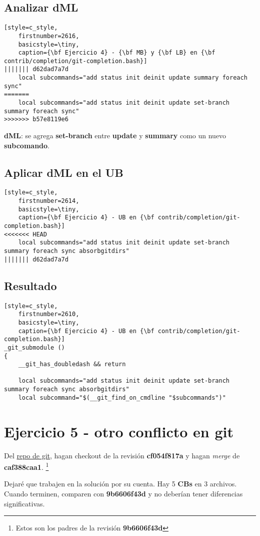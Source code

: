 \subsection*{Analizar {\bf dML}}
\begin{lstlisting}[style=c_style,
	firstnumber=2616,
	basicstyle=\tiny,
	caption={\bf Ejercicio 4} - {\bf MB} y {\bf LB} en {\bf contrib/completion/git-completion.bash}]
||||||| d62dad7a7d
	local subcommands="add status init deinit update summary foreach sync"
=======
	local subcommands="add status init deinit update set-branch summary foreach sync"
>>>>>>> b57e8119e6
\end{lstlisting}

{\bf dML}: se agrega {\bf set-branch} entre {\bf update} y {\bf summary} como un nuevo {\bf subcomando}.

\subsection*{Aplicar {\bf dML} en el {\bf UB}}
\begin{lstlisting}[style=c_style,
	firstnumber=2614,
	basicstyle=\tiny,
	caption={\bf Ejercicio 4} - UB en {\bf contrib/completion/git-completion.bash}]
<<<<<<< HEAD
	local subcommands="add status init deinit update set-branch summary foreach sync absorbgitdirs"
||||||| d62dad7a7d
\end{lstlisting}

\subsection*{Resultado}
\begin{lstlisting}[style=c_style,
	firstnumber=2610,
	basicstyle=\tiny,
	caption={\bf Ejercicio 4} - UB en {\bf contrib/completion/git-completion.bash}]
_git_submodule ()
{
	__git_has_doubledash && return

	local subcommands="add status init deinit update set-branch summary foreach sync absorbgitdirs"
	local subcommand="$(__git_find_on_cmdline "$subcommands")"
\end{lstlisting}


\section{Ejercicio 5 - otro conflicto en git}
\label{exercise_05}
Del \hyperref[git_repo]{repo de git}, hagan checkout de la revisión {\bf cf054f817a} y hagan {\it merge} de {\bf caf388caa1}.
\footnote{Estos son los padres de la revisión {\bf 9b6606f43d}}

Dejaré que trabajen en la solución por su cuenta. Hay 5 {\bf CBs} en 3 archivos. Cuando terminen, comparen
con {\bf 9b6606f43d} y no deberían tener diferencias significativas.
